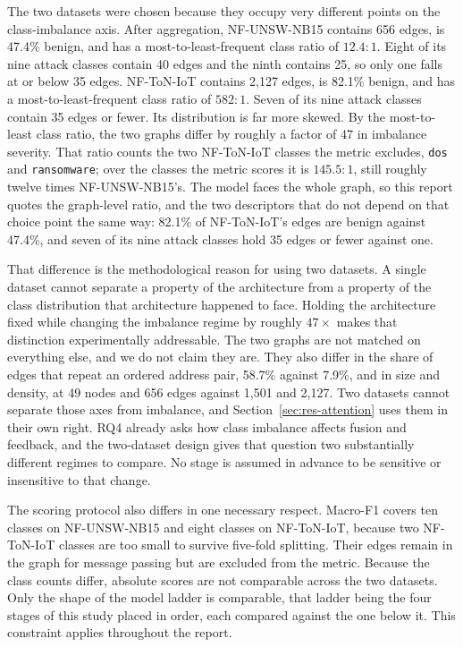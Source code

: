 The two datasets were chosen because they occupy very different points on the
class-imbalance axis. After aggregation, NF-UNSW-NB15 contains 656 edges, is 47.4\%
benign, and has a most-to-least-frequent class ratio of $12.4{:}1$. Eight of its nine
attack classes contain 40 edges and the ninth contains 25, so only one falls at or below
35 edges. NF-ToN-IoT contains 2{,}127 edges, is 82.1\% benign, and has a most-to-least-frequent
class ratio of $582{:}1$. Seven of its nine attack classes contain 35 edges or fewer. Its
distribution is far more skewed. By the most-to-least class ratio, the two
graphs differ by roughly a factor of 47 in imbalance severity. That ratio counts the two
NF-ToN-IoT classes the metric excludes, \texttt{dos} and \texttt{ransomware}; over the classes
the metric scores it is $145.5{:}1$, still roughly twelve times NF-UNSW-NB15's. The model faces
the whole graph, so this report quotes the graph-level ratio, and the two descriptors that do not
depend on that choice point the same way: 82.1\% of NF-ToN-IoT's edges are benign against
47.4\%, and seven of its nine attack classes hold 35 edges or fewer against one.

That difference is the methodological reason for using two datasets. A single dataset
cannot separate a property of the architecture from a property of the class distribution
that architecture happened to face. Holding the architecture fixed while changing the
imbalance regime by roughly $47\times$ makes that distinction experimentally addressable.
The two graphs are not matched on everything else, and we do not claim they are. They also
differ in the share of edges that repeat an ordered address pair, 58.7\% against 7.9\%, and
in size and density, at 49 nodes and 656 edges against 1{,}501 and 2{,}127. Two datasets
cannot separate those axes from imbalance, and Section~\ref{sec:res-attention} uses them in
their own right.
RQ4 already asks how class imbalance affects fusion and feedback, and the two-dataset design
gives that question two substantially different regimes to compare. No stage is assumed in
advance to be sensitive or insensitive to that change.

The scoring protocol also differs in one necessary respect. Macro-F1 covers ten classes on
NF-UNSW-NB15 and eight classes on NF-ToN-IoT, because two NF-ToN-IoT classes are too small
to survive five-fold splitting. Their edges remain in the graph for message passing but
are excluded from the metric. Because the class counts differ, absolute scores are not
comparable across the two datasets. Only the shape of the model ladder is comparable, that
ladder being the four stages of this study placed in order, each compared against the one below
it. This constraint applies throughout the report.

